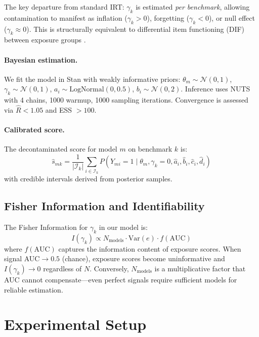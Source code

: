\documentclass[11pt,a4paper]{article}
\begin{document}
The key departure from standard IRT: $\gamma_k$ is estimated \emph{per benchmark}, allowing contamination to manifest as inflation ($\gamma_k > 0$), forgetting ($\gamma_k < 0$), or null effect ($\gamma_k \approx 0$). This is structurally equivalent to differential item functioning (DIF) between exposure groups \cite{holland1993dif,zumbo1999dif}.

\paragraph{Bayesian estimation.} We fit the model in Stan with weakly informative priors: $\theta_m \sim \mathcal{N}(0,1)$, $\gamma_k \sim \mathcal{N}(0,1)$, $a_i \sim \text{LogNormal}(0,0.5)$, $b_i \sim \mathcal{N}(0,2)$. Inference uses NUTS with 4 chains, 1000 warmup, 1000 sampling iterations. Convergence is assessed via $\hat{R} < 1.05$ and ESS $> 100$.

\paragraph{Calibrated score.} The decontaminated score for model $m$ on benchmark $k$ is:
\begin{equation}
\hat{s}_{mk} = \frac{1}{|\mathcal{I}_k|}\sum_{i \in \mathcal{I}_k} P(Y_{mi}=1 \mid \theta_m, \gamma_k=0, \hat{a}_i, \hat{b}_i, \hat{c}_i, \hat{d}_i)
\end{equation}
with credible intervals derived from posterior samples.

\subsection{Fisher Information and Identifiability}
\label{sec:fisher}

The Fisher Information for $\gamma_k$ in our model is:
\begin{equation}
I(\gamma_k) \propto N_{\text{models}} \cdot \text{Var}(e) \cdot f(\text{AUC})
\end{equation}
where $f(\text{AUC})$ captures the information content of exposure scores. When signal AUC$\to 0.5$ (chance), exposure scores become uninformative and $I(\gamma_k) \to 0$ regardless of $N$. Conversely, $N_{\text{models}}$ is a multiplicative factor that AUC cannot compensate---even perfect signals require sufficient models for reliable estimation.

\section{Experimental Setup}
\label{sec:setup}
\end{document}
